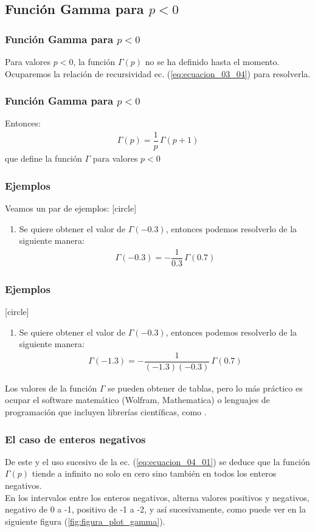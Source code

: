 \subsection{Función Gamma para \texorpdfstring{$p < 0$}{p < 0}}
\begin{frame}
\frametitle{Función Gamma para $p < 0$}
Para valores $p < 0$, la función $\Gamma (p)$ no se ha definido hasta el momento.
\\
\bigskip
\pause
Ocuparemos la relación de recursividad ec. (\ref{eq:ecuacion_03_04}) para resolverla.
\end{frame}
\begin{frame}
\frametitle{Función Gamma para $p < 0$}
Entonces:
\begin{align}
\boxed{\Gamma (p) = \dfrac{1}{p} \, \Gamma (p + 1)}
\label{eq:ecuacion_04_01}
\end{align}
que define la función $\Gamma$ para valores $p < 0$
\end{frame}
\begin{frame}
\frametitle{Ejemplos}
Veamos un par de ejemplos: 
[circle]
\begin{enumerate}[<+->]
\item  Se quiere obtener el valor de $\Gamma (-0.3)$, entonces podemos resolverlo de la siguiente manera:
\begin{align*}
\Gamma (-0.3) = - \dfrac{1}{0.3} \, \Gamma (0.7)
\end{align*}
\seti
\end{enumerate}
\end{frame}
\begin{frame}
\frametitle{Ejemplos}
[circle]
\begin{enumerate}[<+->]
\conti
\item  Se quiere obtener el valor de $\Gamma (-0.3)$, entonces podemos resolverlo de la siguiente manera:
\begin{align*}
\Gamma (-1.3) = - \dfrac{1}{(-1.3)(-0.3)} \, \Gamma (0.7)
\end{align*}
\end{enumerate}
\fontsize{12}{12}\selectfont
Los valores de la función $\Gamma$ se pueden obtener de tablas, pero lo más práctico es ocupar el software matemático (Wolfram, Mathematica) o lenguajes de programación que incluyen librerías científicas, como \python.
\end{frame}
\begin{frame}
\frametitle{El caso de enteros negativos}
De este y el uso sucesivo de la ec. (\ref{eq:ecuacion_04_01}) se deduce que la función $\Gamma (p)$ tiende a infinito no solo en cero sino también en todos los enteros negativos.
\\
\bigskip
\pause
En los intervalos entre los enteros negativos, alterna valores positivos y negativos, negativo de 0 a -1, positivo de -1 a -2, y así sucesivamente, como puede ver en la siguiente figura (\ref{fig:figura_plot_gamma}).
\end{frame}
